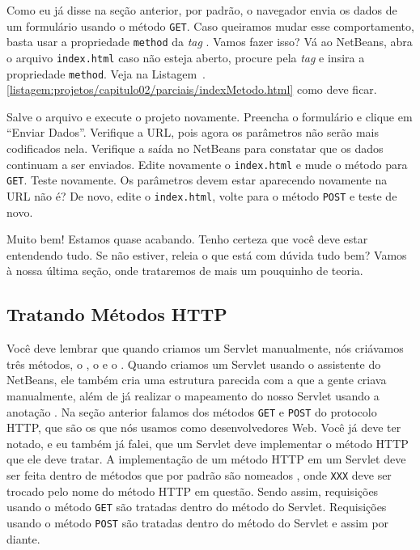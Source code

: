 Como eu já disse na seção anterior, por padrão, o navegador envia os dados de um formulário usando o método \texttt{GET}. Caso queiramos mudar esse comportamento, basta usar a propriedade \texttt{method} da \textit{tag} . Vamos fazer isso? Vá ao NetBeans, abra o arquivo \texttt{index.html} caso não esteja aberto, procure pela \textit{tag}  e insira a propriedade \texttt{method}. Veja na Listagem~\thechapter.\ref{listagem:projetos/capitulo02/parciais/indexMetodo.html} como deve ficar.


Salve o arquivo e execute o projeto novamente. Preencha o formulário e clique em ``Enviar Dados''. Verifique a URL, pois agora os parâmetros não serão mais codificados nela. Verifique a saída no NetBeans para constatar que os dados continuam a ser enviados. Edite novamente o \texttt{index.html} e mude o método para \texttt{GET}. Teste novamente. Os parâmetros devem estar aparecendo novamente na URL não é? De novo, edite o \texttt{index.html}, volte para o método \texttt{POST} e teste de novo.

Muito bem! Estamos quase acabando. Tenho certeza que você deve estar entendendo tudo. Se não estiver, releia o que está com dúvida tudo bem? Vamos à nossa última seção, onde trataremos de mais um pouquinho de teoria.



\subsection{Tratando Métodos HTTP}

Você deve lembrar que quando criamos um Servlet manualmente, nós criávamos três métodos, o , o  e o . Quando criamos um Servlet usando o assistente do NetBeans, ele também cria uma estrutura parecida com a que a gente criava manualmente, além de já realizar o mapeamento do nosso Servlet usando a anotação . Na seção anterior falamos dos métodos \texttt{GET} e \texttt{POST} do protocolo HTTP, que são os que nós usamos como desenvolvedores Web. Você já deve ter notado, e eu também já falei, que um Servlet deve implementar o método HTTP que ele deve tratar. A implementação de um método HTTP em um Servlet deve ser feita dentro de métodos que por padrão são nomeados , onde \texttt{XXX} deve ser trocado pelo nome do método HTTP em questão. Sendo assim, requisições usando o método \texttt{GET} são tratadas dentro do método  do Servlet. Requisições usando o método \texttt{POST} são tratadas dentro do método  do Servlet e assim por diante.

